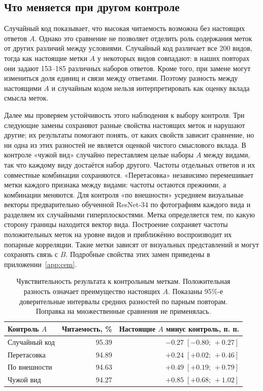 \documentclass[10pt]{article}
\newcommand{\ci}[2]{[#1;\,#2]}
\begin{document}
\subsection{Что меняется при другом контроле}
Случайный код показывает, что высокая читаемость возможна без настоящих ответов $A$. Однако это сравнение не позволяет отделить роль содержания меток от других различий между условиями. Случайный код различает все 200 видов, тогда как настоящие метки $A$ у некоторых видов совпадают: в наших повторах они задают 153--185 различных наборов ответов. Кроме того, при замене могут измениться доля единиц и связи между ответами. Поэтому разность между настоящими $A$ и случайным кодом нельзя интерпретировать как оценку вклада смысла меток.

Далее мы проверяем устойчивость этого наблюдения к выбору контроля. Три следующие замены сохраняют разные свойства настоящих меток и нарушают другие; их результаты помогают понять, от каких свойств зависит сравнение, но ни одна из этих разностей не является оценкой чистого смыслового вклада. В контроле «чужой вид» случайно переставляем целые наборы $A$ между видами, так что каждому виду достаётся набор другого. Частоты отдельных ответов и их совместные комбинации сохраняются. «Перетасовка» независимо перемешивает метки каждого признака между видами: частоты остаются прежними, а комбинации меняются. Для контроля «по внешности» усредняем визуальные векторы предварительно обученной ResNet-34 по фотографиям каждого вида и разделяем их случайными гиперплоскостями. Метка определяется тем, по какую сторону границы находится вектор вида. Построение сохраняет частоты положительных меток на уровне видов и приближённо воспроизводит их попарные корреляции. Такие метки зависят от визуальных представлений и могут сохранять связь с $B$. Подробные свойства этих замен приведены в приложении~\ref{app:cem}.

\begin{table}[htbp]
\centering\small
\caption{Чувствительность результата к контрольным меткам. Положительная разность означает преимущество настоящих $A$. Показаны 95\%-е доверительные интервалы средних разностей по парным повторам. Поправка на множественные сравнения не применялась.}
\label{tab:controls}
\begin{tabularx}{\linewidth}{Yrr}\toprule
Контроль $A$ & Читаемость, \% & Настоящие $A$ минус контроль, п. п.\\\midrule
Случайный код & 95.39 & $-0.27\;\ci{-0.80}{+0.27}$\\
Перетасовка & 94.89 & $+0.24\;\ci{+0.02}{+0.46}$\\
По внешности & 94.63 & $+0.49\;\ci{+0.19}{+0.79}$\\
Чужой вид & 94.27 & $+0.85\;\ci{+0.68}{+1.02}$\\\bottomrule
\end{tabularx}
\end{table}
\end{document}
